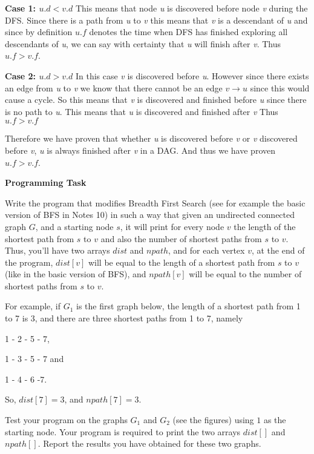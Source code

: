 \documentclass[11pt]{article}
\begin{document}
    \textbf{Case 1: $u.d < v.d$} 
    This means that node \textit{u} is discovered before node \textit{v} during the DFS. Since there is a path from \textit{u} to \textit{v} this means that \textit{v} is a descendant of \textit{u} and since by definition $u.f$ denotes the time when DFS has finished exploring all descendants of \textit{u}, we can say with certainty that \textit{u} will finish after \textit{v}. 
    \newline Thus $u.f>v.f$.

    \medskip
    \textbf{Case 2: $u.d > v.d$}
    In this case \textit{v} is discovered before \textit{u}. However since there exists an edge from \textit{u} to \textit{v} we know that there cannot be an edge $v \rightarrow u$ since this would cause a cycle. So this means that \textit{v} is discovered and finished before \textit{u} since there is no path to \textit{u}. This means that \textit{u} is discovered and finished after \textit{v}
    \newline Thus $u.f > v.f$

    \medskip
    Therefore we have proven that whether \textit{u} is discovered before \textit{v} or \textit{v} discovered before \textit{v}, \textit{u} is always finished after \textit{v} in a DAG. And thus we have proven $u.f > v.f$.

\newpage
\textbf{Programming Task}

Write the program that modifies Breadth First Search  (see for example  the basic version of BFS in Notes 10) in such a way that given an undirected connected graph $G$, and a starting node $s$, it will print for every node $v$ the length of the shortest path from $s$ to $v$ and also the number of shortest paths from $s$ to $v$. Thus, you'll have two arrays $dist$ and $npath$, and for each vertex $v$, at the end of the program, $dist[v]$ will be equal to the length of a shortest path from $s$ to $v$ (like in the basic version of BFS), and $npath[v]$ will be equal to the number of shortest paths from $s$ to $v$.


For example, if $G_1$ is the first graph below, the length of a shortest path from 1 to 7 is 3, and there are three shortest paths from 1 to 7, namely 

1 - 2 - 5 - 7, 

1 - 3 - 5 - 7 and 

1 - 4 - 6 -7.

So,  $dist[7]=3$, and $npath[7] = 3$.
\medskip


Test your program on the graphs $G_1$ and $G_2$ (see the figures) using $1$ as the starting node. Your program is required to print the two arrays $dist[]$ and $npath[]$. Report the results you have obtained for these two graphs. 
\end{document}
